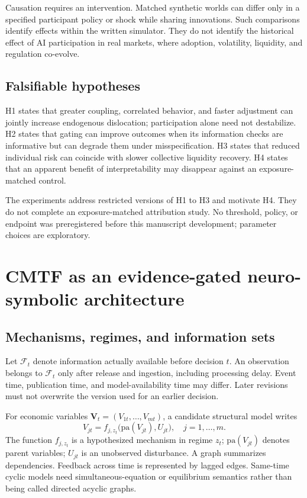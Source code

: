 Causation requires an intervention. Matched synthetic worlds can differ only in a specified participant policy or shock while sharing innovations. Such comparisons identify effects within the written simulator. They do not identify the historical effect of AI participation in real markets, where adoption, volatility, liquidity, and regulation co-evolve.

\subsection{Falsifiable hypotheses}
H1 states that greater coupling, correlated behavior, and faster adjustment can jointly increase endogenous dislocation; participation alone need not destabilize. H2 states that gating can improve outcomes when its information checks are informative but can degrade them under misspecification. H3 states that reduced individual risk can coincide with slower collective liquidity recovery. H4 states that an apparent benefit of interpretability may disappear against an exposure-matched control.

The experiments address restricted versions of H1 to H3 and motivate H4. They do not complete an exposure-matched attribution study. No threshold, policy, or endpoint was preregistered before this manuscript development; parameter choices are exploratory.

\section{CMTF as an evidence-gated neuro-symbolic architecture}
\subsection{Mechanisms, regimes, and information sets}
Let $\mathcal F_t$ denote information actually available before decision $t$. An observation belongs to $\mathcal F_t$ only after release and ingestion, including processing delay. Event time, publication time, and model-availability time may differ. Later revisions must not overwrite the version used for an earlier decision.

For economic variables $\mathbf V_t=(V_{1t},\ldots,V_{mt})$, a candidate structural model writes
\begin{equation}
V_{jt}=f_{j,z_t}\bigl(\mathrm{pa}(V_{jt}),U_{jt}\bigr),\quad j=1,\ldots,m.
\label{eq:scm}
\end{equation}
The function $f_{j,z_t}$ is a hypothesized mechanism in regime $z_t$; $\mathrm{pa}(V_{jt})$ denotes parent variables; $U_{jt}$ is an unobserved disturbance. A graph summarizes dependencies. Feedback across time is represented by lagged edges. Same-time cyclic models need simultaneous-equation or equilibrium semantics rather than being called directed acyclic graphs.

